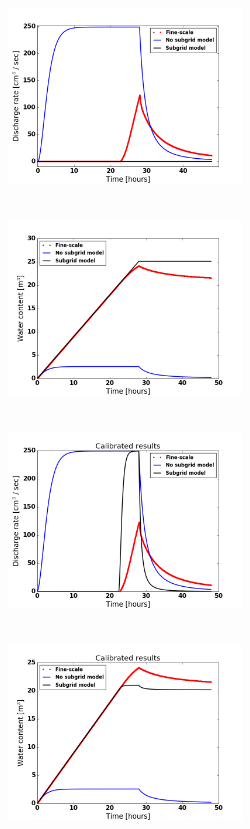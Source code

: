 \documentclass[review,11pt]{elsarticle}
\begin{document}
\begin{figure}[!h]
\centering
\includegraphics[width=6.2cm, height=5.5cm]{./figures/POLYGON45/POLYGON45discharge2.png}
\includegraphics[width=6.2cm, height=5.5cm]{./figures/POLYGON45/POLYGON45watercontent.png}\\
\includegraphics[width=6.2cm, height=5.5cm]{./figures/POLYGON45/POLYGON45dischargeCalibDD.png}
\includegraphics[width=6.2cm, height=5.5cm]{./figures/POLYGON45/POLYGON45watercontentCalibDD.png} \\

\end{figure}
\end{document}
